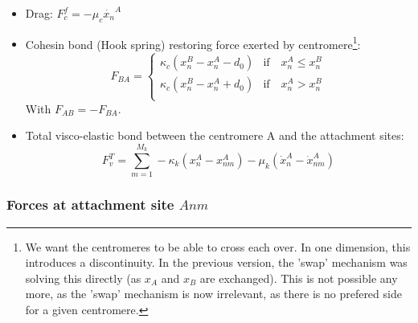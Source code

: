 \documentclass[a4paper,12pt]{article}
\renewcommand{\leq}{\leqslant}
\begin{document}
\begin{itemize}
\item Drag: $F_c^f = -\mu_c \dot{x_n}^A$
\item Cohesin bond (Hook spring) restoring force exerted by
  centromere\footnote{We want the centromeres to be able to cross each
    over. In one dimension, this introduces a discontinuity. In the
    previous version, the 'swap' mechanism was solving this directly
    (as $x_A$ and $x_B$ are exchanged). This is not possible any more,
    as the 'swap' mechanism is now irrelevant, as there is no prefered
    side for a given centromere.}:
  \begin{equation}
    F_{BA} =
    \begin{cases}
      \kappa_c (x_n^B - x_n^A - d_0) &\mathrm{if}\quad x_n^A \leq x_n^B\\
      \kappa_c (x_n^B - x_n^A + d_0) &\mathrm{if}\quad  x_n^A > x_n^B\\
    \end{cases}
  \end{equation}
  With $F_{AB} = - F_{BA}$. 
\item Total visco-elastic bond between the centromere A and the attachment
  sites:
  $$ F_v^T = \sum_{m = 1}^{M_k} -\kappa_k(x_n^A - x_{nm}^A) 
  - \mu_k(\dot{x}_n^A - \dot{x}_{nm}^A) $$
\end{itemize}


\subsubsection{Forces at attachment site $Anm$}
\end{document}
